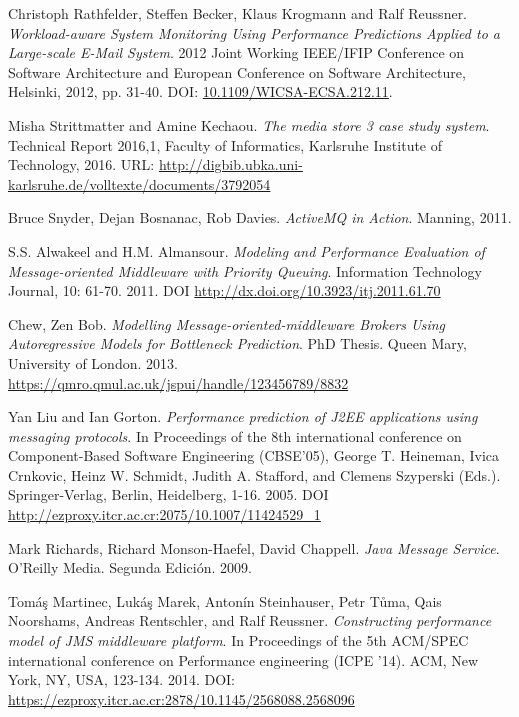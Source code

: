 \documentclass[11pt, twoside]{report}
\begin{document}
\begin{thebibliography}{9}
 Christoph Rathfelder, Steffen Becker, Klaus Krogmann and Ralf Reussner. \emph{Workload-aware System Monitoring Using Performance Predictions Applied to a Large-scale E-Mail System}. 2012 Joint Working IEEE/IFIP Conference on Software Architecture and European Conference on Software Architecture, Helsinki, 2012, pp. 31-40.
DOI: \href{https://ezproxy.itcr.ac.cr:2878/10.1109/WICSA-ECSA.212.11}{10.1109/WICSA-ECSA.212.11}. 

 Misha Strittmatter and Amine Kechaou. \emph{The media store 3 case study system}. Technical Report 2016,1, Faculty of Informatics, Karlsruhe Institute of Technology, 2016. URL: \url{http://digbib.ubka.uni-karlsruhe.de/volltexte/documents/3792054}

 Bruce Snyder, Dejan Bosnanac, Rob Davies. \emph{ActiveMQ in Action}. Manning, 2011. 

 S.S. Alwakeel and H.M. Almansour. \emph{Modeling and Performance Evaluation of Message-oriented Middleware with Priority Queuing}. Information Technology Journal, 10: 61-70. 2011. DOI \url{http://dx.doi.org/10.3923/itj.2011.61.70}

 Chew, Zen Bob. \emph{Modelling Message-oriented-middleware Brokers Using Autoregressive Models for Bottleneck Prediction}. PhD Thesis. Queen Mary, University of London. 2013. \url{https://qmro.qmul.ac.uk/jspui/handle/123456789/8832} 

 Yan Liu and Ian Gorton. \emph{Performance prediction of J2EE applications using messaging protocols}. In Proceedings of the 8th international conference on Component-Based Software Engineering (CBSE'05), George T. Heineman, Ivica Crnkovic, Heinz W. Schmidt, Judith A. Stafford, and Clemens Szyperski (Eds.). Springer-Verlag, Berlin, Heidelberg, 1-16. 2005. DOI \url{http://ezproxy.itcr.ac.cr:2075/10.1007/11424529_1}

 Mark Richards, Richard Monson-Haefel, David Chappell. \emph{Java Message Service}. O'Reilly Media. Segunda Edición. 2009.

 Tomáş Martinec, Lukáş Marek, Antonín Steinhauser, Petr Tůma, Qais Noorshams, Andreas Rentschler, and Ralf Reussner. \emph{Constructing performance model of JMS middleware platform}. In Proceedings of the 5th ACM/SPEC international conference on Performance engineering (ICPE '14). ACM, New York, NY, USA, 123-134. 2014. DOI: \url{https://ezproxy.itcr.ac.cr:2878/10.1145/2568088.2568096}


\end{thebibliography}
\end{document}
